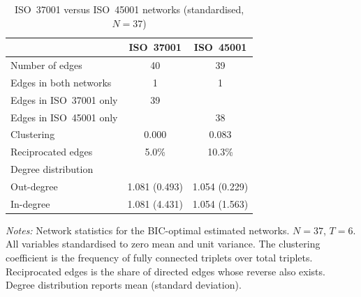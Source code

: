 \documentclass{article}
\begin{document}
\pagestyle{empty}
\begin{table}[htbp]
\centering
\caption{ISO~37001 versus ISO~45001 networks (standardised, $N=37$)}
\label{tab:networks_std}
\begin{tabular}{lcc}
\hline\hline
 & ISO~37001 & ISO~45001 \\
\hline
Number of edges & 40 & 39 \\
Edges in both networks & 1 & 1 \\
Edges in ISO~37001 only & 39 & \\
Edges in ISO~45001 only & & 38 \\
Clustering & 0.000 & 0.083 \\
Reciprocated edges & 5.0\% & 10.3\% \\
Degree distribution & & \\
\quad Out-degree & 1.081 (0.493) & 1.054 (0.229) \\
\quad In-degree & 1.081 (4.431) & 1.054 (1.563) \\
\hline\hline
\end{tabular}
\begin{minipage}{0.85\textwidth}
\vspace{4pt}
\footnotesize \textit{Notes:} Network statistics for the BIC-optimal estimated networks. $N=37$, $T=6$. All variables standardised to zero mean and unit variance. The clustering coefficient is the frequency of fully connected triplets over total triplets. Reciprocated edges is the share of directed edges whose reverse also exists. Degree distribution reports mean (standard deviation).
\end{minipage}
\end{table}
\end{document}
